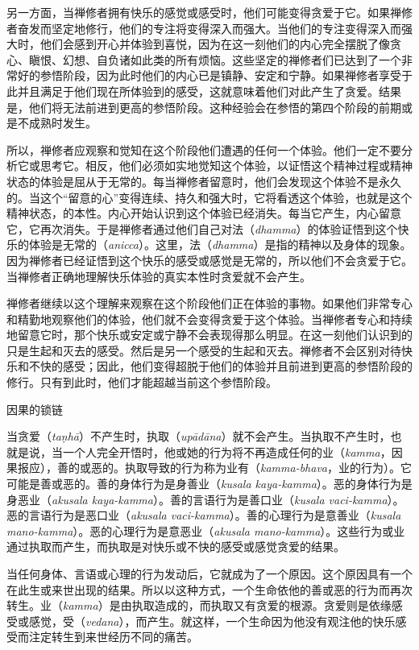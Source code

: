 另一方面，当禅修者拥有快乐的感觉或感受时，他们可能变得贪爱于它。如果禅修者奋发而坚定地修行，他们的专注将变得深入而强大。当他们的专注变得深入而强大时，他们会感到开心并体验到喜悦，因为在这一刻他们的内心完全摆脱了像贪心、瞋恨、幻想、自负诸如此类的所有烦恼。这些坚定的禅修者们已达到了一个非常好的参悟阶段，因为此时他们的内心已是镇静、安定和宁静。如果禅修者享受于此并且满足于他们现在所体验到的感受，这就意味着他们对此产生了贪爱。结果是，他们将无法前进到更高的参悟阶段。这种经验会在参悟的第四个阶段的前期或是不成熟时发生。

所以，禅修者应观察和觉知在这个阶段他们遭遇的任何一个体验。他们一定不要分析它或思考它。相反，他们\1必须如实地觉知这个体验，以证悟这个精神过程或精神状态的体验是屈从于无常的。每当禅修者留意时，他们会发现这个体验不是永久的。当这个“留意的心”变得连续、持久和强大时，它将看透这个体验，也就是这个精神状态，的本性。内心开始认识到这个体验已经消失。每当它产生，内心留意它，它再次消失。于是禅修者通过他们自己对法（{\it dhamma}）的体验证悟到这个快乐的体验是无常的（{\it anicca}）。这里，法（{\it dhamma}）是指的精神以及身体的现象。因为禅修者已经证悟到这个快乐的感受或感觉是无常的，所以他们不会贪爱于它。当禅修者正确地理解快乐体验的真实本性时贪爱就不会产生。

禅修者继续以这个理解来观察在这个阶段他们正在体验的事物。如果他们非常专心和精勤地观察他们的体验，他们就不会变得贪爱于这个体验。当禅修者专心和持续地留意它时，那个快乐或安定或宁静不会表现得那么明显。在这一刻他们认识到的只是生起和灭去的感受。然后是另一个感受的生起和灭去。禅修者不会区别对待快乐和不快的感受；因此，他们变得超脱于他们的体验并且前进到更高的参悟阶段的修行。只有到此时，他们才能超越当前这个参悟阶段。

\sssubsectnonb \1因果的锁链

当贪爱（{\it ta\d nh\=a}）不产生时，执取（{\it up\=ad\=ana}）就不会产生。当执取不产生时，也就是说，当一个人完全开悟时，他或她的行为将不再造成任何的业（{\it kamma}，因果报应），善的或恶的。执取导致的行为称为业有（{\it kamma-bhava}，业的行为）。它可能是善或恶的。善的身体行为是身善业（{\it kusala kaya-kamma}）。恶的身体行为是身恶业（{\it akusala kaya-kamma}）。善的言语行为是善口业（{\it kusala vaci-kamma}）。恶的言语行为是恶口业（{\it akusala vaci-kamma}）。善的心理行为是意善业（{\it kusala mano-kamma}）。恶的心理行为是意恶业（{\it akusala mano-kamma}）。这些行为或业通过执取而产生，而执取是对快乐或不快的感受或感觉贪爱的结果。

当任何身体、言语或心理的行为发动后，它就成为了一个原因。这个原因具有一个在此生或来世出现的结果。所以以这种方式，一个生命依他的善或恶的行为而再次转生。业（{\it kamma}）是由执取造成的，而执取又有贪爱的根源。贪爱则是依缘感受或感觉，受（{\it vedana}），而产生。就这样，一个生命因为他没有观注他的快乐感受而注定转生到来世经历不同的痛苦。

